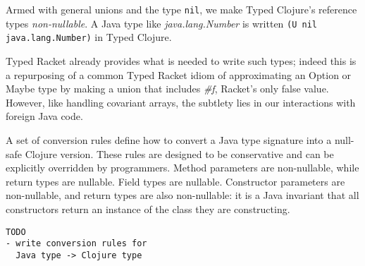 \documentclass[preprint,10pt]{sigplanconf}
\begin{document}
Armed with general unions and the type \lstinline|nil|, 
we make Typed Clojure's reference types \emph{non-nullable}.
A Java type like \emph{java.lang.Number} is written \lstinline|(U nil java.lang.Number)|
in Typed Clojure.

Typed Racket already provides what is needed to write such types; indeed this is a repurposing
of a common Typed Racket idiom of approximating an Option or Maybe type by
making a union that includes \emph{\#f}, Racket's only false value.
However, like handling covariant arrays, the subtlety lies in our interactions with foreign
Java code.

A set of conversion rules define how to convert a Java type signature into a null-safe
Clojure version. These rules are designed to be conservative and can be explicitly overridden
by programmers. Method parameters are non-nullable, while return types are nullable.
Field types are nullable. Constructor parameters are non-nullable, and return types
are also non-nullable: it is a Java invariant that all constructors return an instance
of the class they are constructing.

\begin{verbatim}
TODO 
- write conversion rules for 
  Java type -> Clojure type
\end{verbatim}

%

%







%
%
\end{document}
